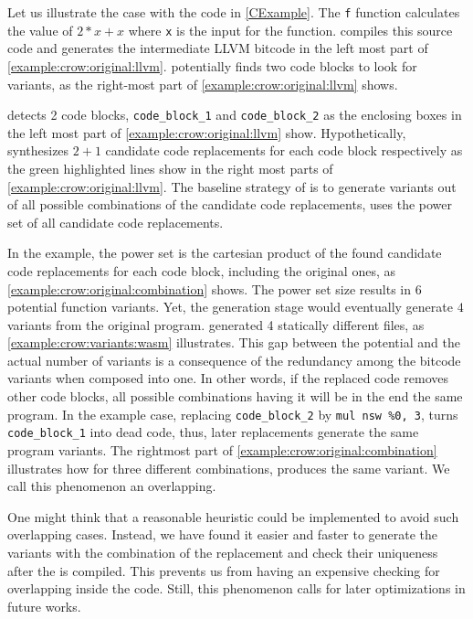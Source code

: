 Let us illustrate the case with the code in \autoref{CExample}. The \texttt{f} function calculates the value of $2 * x + x$ where \texttt{x} is the input for the function.  compiles this source code and generates the intermediate LLVM bitcode in the left most part of \autoref{example:crow:original:llvm}. potentially finds two code blocks to look for variants, as the right-most part of \autoref{example:crow:original:llvm} shows.



detects 2 code blocks, \texttt{code\_block\_1} and \texttt{code\_block\_2} as the enclosing boxes in the left most part of \autoref{example:crow:original:llvm} show. Hypothetically, synthesizes $2 + 1$ candidate code replacements for each code block respectively as the green highlighted lines show in the right most parts of \autoref{example:crow:original:llvm}.
The baseline strategy of is to generate variants out of all possible combinations of the candidate code replacements, \ie uses the power set of all candidate code replacements.

In the example, the power set is the cartesian product of the found candidate code replacements for each code block, including the original ones, as \autoref{example:crow:original:combination} shows. The power set size results in $6$ potential function variants. Yet, the generation stage would eventually generate $4$ variants from the original program. generated 4 statically different files, as \autoref{example:crow:variants:wasm} illustrates. This gap between the potential and the actual number of variants is a consequence of the redundancy among the bitcode variants when composed into one. In other words, if the replaced code removes other code blocks, all possible combinations having it will be in the end the same program. In the example case, replacing \texttt{code\_block\_2} by \texttt{mul nsw \%0, 3}, turns \texttt{code\_block\_1} into dead code, thus, later replacements generate the same program variants. The rightmost part of \autoref{example:crow:original:combination} illustrates how for three different combinations, produces the same variant. We call this phenomenon an overlapping.



One might think that a reasonable heuristic could be implemented to avoid such overlapping cases. Instead, we have found it easier and faster to generate the variants with the combination of the replacement and check their uniqueness after the is compiled. This prevents us from having an expensive checking for overlapping inside the code. Still, this phenomenon calls for later optimizations in future works.
